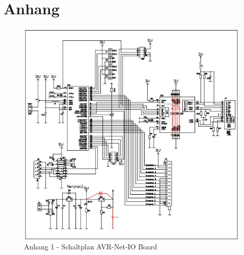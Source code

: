 \chapter{Anhang}
\begin{figure}
\centering
\noindent
\includegraphics[width=\linewidth,height=\textheight,
keepaspectratio]{content/pictures/AVR-NET-IO_schaltplan.jpg}
\caption{Anhang 1 - Schaltplan AVR-Net-IO Board}
\label{fig:B3}
\end{figure}